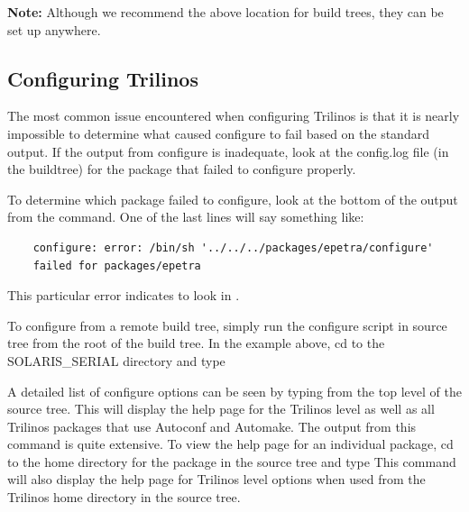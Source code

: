 {\bf Note:} Although we recommend the above location for build trees,
they can be set up anywhere.

\subsection{Configuring Trilinos}
\label{Subsection:ConfiguringTrilinos}

\begin{minipage}[c]{\textwidth}

\begin{minipage}[l]{.6\textwidth}

The most common issue encountered when configuring Trilinos is that it is 
nearly impossible to determine what caused configure to fail based on the 
standard output.  If the output from configure is inadequate, 
look at the config.log file (in the buildtree)
for the package that failed to configure properly.  

\end{minipage}\hfill
{}
\end{minipage}

To determine which 
package failed to configure, look at the bottom of the output from the 
 command.  One of the last lines will say something 
like:

\begin{verbatim}
    configure: error: /bin/sh '../../../packages/epetra/configure'
    failed for packages/epetra
\end{verbatim}

This particular error indicates to look in 
.

	To configure from a remote build tree, simply run the configure script 
in source tree from the root of the build tree.  In the example above, cd to 
the SOLARIS\_SERIAL directory and type 

A detailed list of configure options can be seen by typing
 from the top level of the 
source tree.  This will display the help page for the Trilinos level as well as all 
Trilinos packages that use Autoconf and Automake.  The output from this command
is quite extensive.  To view the help page for an individual package, cd to 
the home directory for the package in the source tree and type 
This command will also display the help page for Trilinos level 
options when used from the Trilinos home directory in the source tree.


